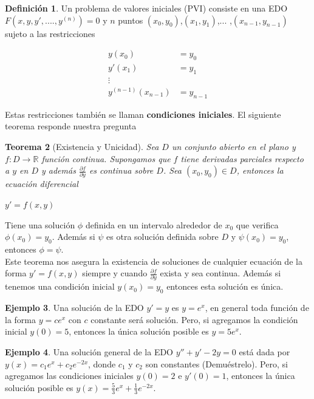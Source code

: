 \documentclass{article}
\theoremstyle{plain}
\newtheorem{thm}{Teorema}[section]
\theoremstyle{definition}
\newtheorem{defin}[thm]{Definición}
\newtheorem{ejem}[thm]{Ejemplo}
\begin{document}
\begin{defin}Un problema de valores iniciales (PVI) consiste en una EDO $F(x,y,y',....,y^{(n)})=0$ y $n$ puntos $(x_0,y_0)$,$(x_1,y_1)$,... ,$(x_{n-1},y_{n-1})$ sujeto a las restricciones
\end{defin}

\begin{align*}
y(x_0)&=y_0 \\
y'(x_1)&=y_1 \\
\vdots \\
y^{(n-1)}(x_{n-1}) &=y_{n-1}
\end{align*}

Estas restricciones también se llaman \textbf{condiciones iniciales}. El siguiente teorema responde nuestra pregunta \\

\begin{thm}[Existencia y Unicidad]Sea $D$ un conjunto abierto en el plano y $f: D \to \mathbb{R}$ función continua. Supongamos que $f$ tiene derivadas parciales respecto a $y$ en $D$ y además $\frac{\partial f}{\partial y}$ es continua sobre $D$. Sea $(x_0,y_0) \in D$, entonces la ecuación diferencial
\end{thm}

\begin{center}
$y'=f(x,y)$
\end{center}

Tiene una solución $\phi$ definida en un intervalo alrededor de $x_0$ que verifica $\phi(x_0)=y_0$. Además si $\psi$ es otra solución definida sobre $D$ y $\psi(x_0)=y_0$, entonces $\phi=\psi$. \\

Este teorema nos asegura la existencia de soluciones de cualquier ecuación de la forma $y'= f(x,y)$ siempre y cuando $\frac{\partial f}{\partial y}$ exista y sea continua. Además si tenemos una condición inicial $y(x_0)=y_0$ entonces esta solución es única. \\

\begin{ejem}Una solución de la  EDO $y'=y$ es $y=e^x$, en general toda función de la forma $y=ce^x$ con $c$ constante será solución. Pero, si agregamos la condición inicial $y(0)=5$, entonces la única solución posible es $y=5e^x$. \\
\end{ejem}

\begin{ejem}Una solución general de la  EDO $y''+y'-2y=0$ está dada por $y(x)=c_1e^x+c_2e^{-2x}$, donde $c_1$ y $c_2$ son constantes (Demuéstrelo). Pero, si agregamos las condiciones iniciales $y(0)=2$ e $y'(0)=1$, entonces la única solución posible es $y(x)= \frac{5}{3}e^{x}+\frac{1}{3}e^{-2x}$. \\
\end{ejem}
\end{document}
